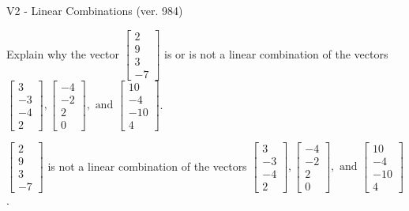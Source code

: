 \begin{exercise}
  \begin{exerciseTitle}V2 - Linear Combinations (ver. 984)\end{exerciseTitle}
  \begin{exerciseStatement}
    Explain why the vector \(\left[\begin{array}{c}
2 \\
9 \\
3 \\
-7
\end{array}\right]\)  is or is not a linear 
	combination of the vectors \(\left[\begin{array}{c}
3 \\
-3 \\
-4 \\
2
\end{array}\right] , \left[\begin{array}{c}
-4 \\
-2 \\
2 \\
0
\end{array}\right] , \text{ and } \left[\begin{array}{c}
10 \\
-4 \\
-10 \\
4
\end{array}\right]\).
	


  \end{exerciseStatement}
  \begin{exerciseAnswer}
   \(\left[\begin{array}{c}
2 \\
9 \\
3 \\
-7
\end{array}\right]\) 
  	 is not  
	a linear combination of the vectors \(\left[\begin{array}{c}
3 \\
-3 \\
-4 \\
2
\end{array}\right] , \left[\begin{array}{c}
-4 \\
-2 \\
2 \\
0
\end{array}\right] , \text{ and } \left[\begin{array}{c}
10 \\
-4 \\
-10 \\
4
\end{array}\right]\).

	
  


  \end{exerciseAnswer}
\end{exercise}